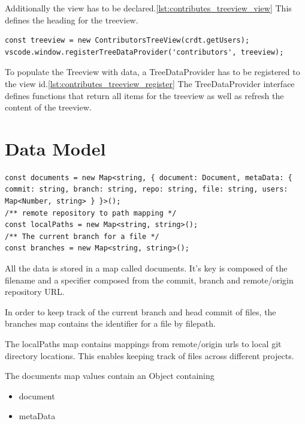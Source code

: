 Additionally the view has to be declared.\ref{lst:contributes_treeview_view} This defines the heading for the treeview.

\begin{lstlisting}[label={lst:contributes_treeview_register}]
const treeview = new ContributorsTreeView(crdt.getUsers);
vscode.window.registerTreeDataProvider('contributors', treeview);
\end{lstlisting}

To populate the Treeview with data, a TreeDataProvider has to be registered to the view id.\ref{lst:contributes_treeview_register}
The TreeDataProvider interface defines functions that return all items for the treeview as well as refresh the content of the treeview.

\section{Data Model}

\begin{lstlisting}
const documents = new Map<string, { document: Document, metaData: { commit: string, branch: string, repo: string, file: string, users: Map<Number, string> } }>();
/** remote repository to path mapping */
const localPaths = new Map<string, string>();
/** The current branch for a file */
const branches = new Map<string, string>();
\end{lstlisting}

All the data is stored in a map called documents.
It's key is composed of the filename and a specifier composed from the commit, branch and remote/origin repository URL.

In order to keep track of the current branch and head commit of files, the branches map contains the identifier for a file by filepath.

The localPaths map contains mappings from remote/origin urls to local git directory locations.
This enables keeping track of files across different projects.

The documents map values contain an Object containing
\begin{itemize}
    \item document
    \item metaData
\end{itemize}

